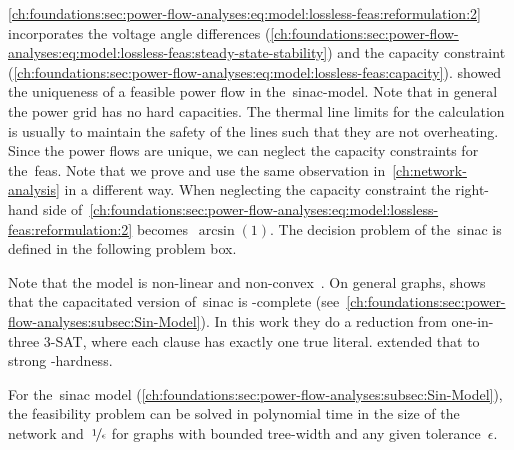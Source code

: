 % 
\cref{ch:foundations:sec:power-flow-analyses:eq:model:lossless-feas:reformulation:2}
incorporates the voltage angle differences
(\cref{ch:foundations:sec:power-flow-analyses:eq:model:lossless-feas:steady-state-stability})
and the capacity constraint
(\cref{ch:foundations:sec:power-flow-analyses:eq:model:lossless-feas:capacity}).
\textcite[p.114; Lemma 4.2.1 \& Theorem 4.2.2]{Ver10} showed the uniqueness of a
feasible power flow in the~\gls{sinac}-model.
% 
% 
Note that in general the power grid has no hard capacities. The thermal line
limits for the calculation is usually to maintain the safety of the lines such
that they are not overheating. Since the power flows are unique, we can neglect
the capacity constraints for the~\acrlong{feas}. Note that we prove and use the
same observation in~\cref{ch:network-analysis} in a different way. When
neglecting the capacity constraint the right-hand side
of~\cref{ch:foundations:sec:power-flow-analyses:eq:model:lossless-feas:reformulation:2}
becomes~$\arcsin(1)$. The decision problem of the~\gls{sinac} is defined in the
following problem box.
% 
\begingroup
    
    \label{ch:fundamentals:problems:SINAC_FEAS-Decision_Problem}
\endgroup
% 
Note that the model is non-linear and non-convex~\parencite{Ver10}.
% 
On general graphs, \textcite{Ver10} shows that the capacitated version
of~\gls{sinac} is \NP-complete
(see~\cref{ch:foundations:sec:power-flow-analyses:subsec:Sin-Model}). In this
work they do a reduction from one-in-three 3-SAT, where each clause has exactly
one true literal. \textcite{Bie19} extended that to strong
\NP-hardness. 

For the~\gls{sinac} model 
(\cref{ch:foundations:sec:power-flow-analyses:subsec:Sin-Model}), the
feasibility problem can be solved in polynomial time in the size of the network
and~$\nicefrac{1}{\epsilon}$ for graphs with bounded tree-width and any given
tolerance~$\epsilon$.
% 
